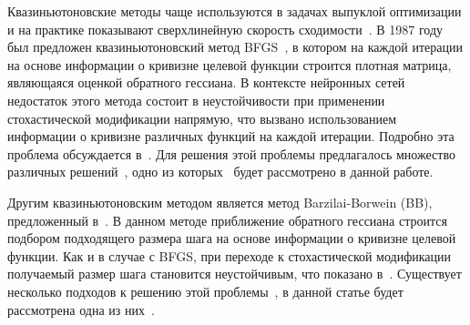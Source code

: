 \documentclass[preprint,12pt]{elsarticle}
\begin{document}
Квазиньютоновские методы чаще используются в задачах выпуклой оптимизации и на практике показывают сверхлинейную скорость сходимости~\cite{numopt}. 
В 1987 году был предложен квазиньютоновский метод BFGS~\cite{BFGSorig}, в котором на каждой итерации на основе информации о кривизне целевой функции строится плотная матрица, являющаяся оценкой обратного гессиана.
В контексте нейронных сетей недостаток этого метода состоит в неустойчивости при применении стохастической модификации напрямую, что вызвано использованием информации о кривизне различных функций на каждой итерации. Подробно эта проблема обсуждается в~\cite{LBFGSunstable}. 
Для решения этой проблемы предлагалось множество различных решений~\cite{onlineBFGS, sampledbfgs, multibatchLBFGS}, одно из которых~\cite{multibatchLBFGS} будет рассмотрено в данной работе.

Другим квазиньютоновским методом является метод \linebreak Barzilai-Borwein (BB), предложенный в~\cite{BBorig}. 
В данном методе приближение обратного гессиана строится подбором подходящего размера шага на основе информации о кривизне целевой функции.
Как и в случае с BFGS, при переходе к стохастической модификации получаемый размер шага становится неустойчивым, что показано в~\cite{barzilaiborwein}. 
Существует несколько подходов к решению этой проблемы~\cite{barzilaiborwein, BB-DL}, в данной статье будет рассмотрена одна из них~\cite{BB-DL}.
\end{document}
